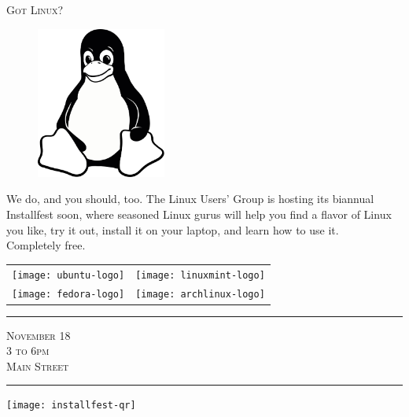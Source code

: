 \documentclass[12pt]{article}
\begin{document}
\pagestyle{empty}

\begin{center} \LARGE \scshape
    Got Linux?
\end{center}

\begin{figure}
    \vspace{-2em} %
    \begin{center}
        \includegraphics[width=0.38\textwidth]{tux-bw}
    \end{center}
    \vspace{-2em} %
\end{figure}

{\small%

    We do, and you should, too. The Linux Users' Group is hosting its biannual
    Installfest soon, where seasoned Linux gurus will help you find a flavor of
    Linux you like, try it out, install it on your laptop, and learn how to use
    it.\\
    Completely free.

}

\begin{center}
\begin{tabular}{SS}
    \texttt{[image: ubuntu-logo]} &
    \texttt{[image: linuxmint-logo]} \\
    \texttt{[image: fedora-logo]} &
    \texttt{[image: archlinux-logo]} \\
\end{tabular}

\begin{minipage}[bt]{0.58\textwidth}
    \begin{center}
        \hrule{}
        \vspace{1em}
        {\large \scshape%
            November 18 \\[0em]
            3 to 6pm \\[0em]
            Main Street \\[0em]
        }
        \vspace{1em}
        \hrule{}
    \end{center}
\end{minipage}
\begin{minipage}[bt]{0.38\textwidth}
    \begin{center}
        \texttt{[image: installfest-qr]}
    \end{center}
\end{minipage}
\end{center}
\end{document}
